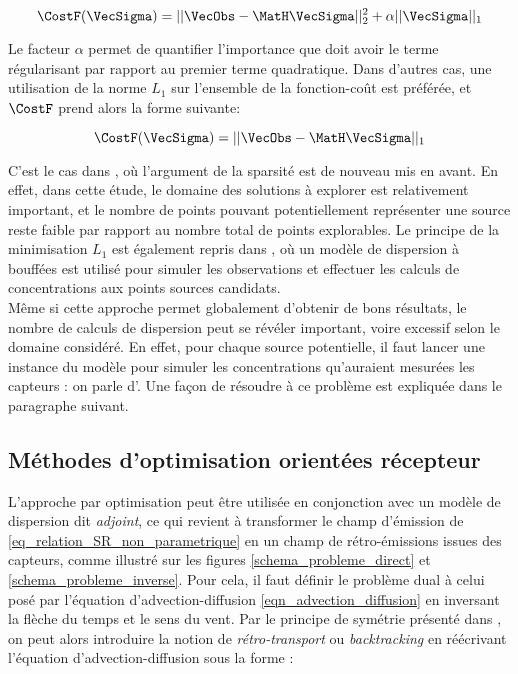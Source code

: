 	\begin{equation}
	\label{eq_regularisation_L1}
	\CostF(\VecSigma) = || \VecObs - \MatH\VecSigma||_2^2 + \alpha||\VecSigma||_1
	\end{equation}
	
	Le facteur $\alpha$ permet de quantifier l'importance que doit avoir le terme régularisant par rapport au premier terme quadratique. Dans d'autres cas, une utilisation de la norme $L_1$ sur l'ensemble de la fonction-coût est préférée, et $\CostF$ prend alors la forme suivante:
	
	\begin{equation}
	\label{eq_moindres_VA}
	\CostF(\VecSigma) = || \VecObs - \MatH\VecSigma||_1
	\end{equation}
	
	
	C'est le cas dans \cite{Cheng2008}, où l'argument de la sparsité est de nouveau mis en avant. En effet, dans cette étude, le domaine des solutions à explorer est relativement important, et le nombre de points pouvant potentiellement représenter une source reste faible par rapport au nombre total de points explorables. Le principe de la minimisation $L_1$ est également repris dans \cite{Konda2010}, où un modèle de dispersion à bouffées est utilisé pour simuler les observations et effectuer les calculs de concentrations aux points sources candidats. \\
	
	Même si cette approche permet globalement d'obtenir de bons résultats, le nombre de calculs de dispersion peut se révéler important, voire excessif selon le domaine considéré. En effet, pour chaque source potentielle, il faut lancer une instance du modèle pour simuler les concentrations qu'auraient mesurées les capteurs : on parle d'. Une façon de résoudre à ce problème est expliquée dans le paragraphe suivant.\\
	
	
	\subsection{Méthodes d'optimisation orientées récepteur}
	
	 L'approche par optimisation peut être utilisée en conjonction avec un modèle de dispersion dit \textit{adjoint}, ce qui revient à transformer le champ d'émission de \eqref{eq_relation_SR_non_parametrique} en un champ de rétro-émissions issues des capteurs, comme illustré sur les figures \ref{schema_probleme_direct} et \ref{schema_probleme_inverse}.
	 Pour cela, il faut définir le problème dual à celui posé par l'équation d'advection-diffusion \eqref{eqn_advection_diffusion} en inversant la flèche du temps et le sens du vent.  Par le principe de symétrie présenté dans \cite{Hourdin2006a}, on peut alors introduire la notion de \textit{rétro-transport} ou \textit{backtracking} en  réécrivant l'équation d'advection-diffusion sous la forme : 
	 
